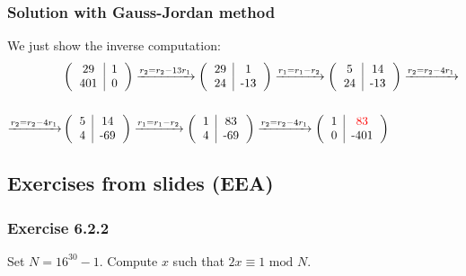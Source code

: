\documentclass[11pt, a4paper]{article}
\newcommand{\mymod}{
    \text{ mod }
}
\begin{document}
\subsubsection*{Solution with Gauss-Jordan method}
We just show the inverse computation:
\begin{align*}
    &\left(\begin{tabular}{c|c}
        29&1\\
        401&0
    \end{tabular}\right)\xrightarrow[]{r_2=r_2-13r_1}
    \left(\begin{tabular}{c|c}
        29&1\\
        24&-13
    \end{tabular}\right)\xrightarrow[]{r_1=r_1-r_2}
    \left(\begin{tabular}{c|c}
        5&14\\
        24&-13
    \end{tabular}\right)\xrightarrow[]{r_2=r_2-4r_1}\\\\\xrightarrow[]{r_2=r_2-4r_1}
    &\left(\begin{tabular}{c|c}
        5&14\\
        4&-69
    \end{tabular}\right)\xrightarrow[]{r_1=r_1-r_2}
    \left(\begin{tabular}{c|c}
        1&83\\
        4&-69
    \end{tabular}\right)\xrightarrow[]{r_2=r_2-4r_1}
    \left(\begin{tabular}{c|c}
        1&\textcolor{red}{83}\\
        0&-401
    \end{tabular}\right)
\end{align*}

\newpage
\subsection{Exercises from slides (EEA)}
\subsubsection{Exercise 6.2.2}
Set $N=16^{30}-1$. Compute $x$ such that $2x\equiv1\mymod N$.
\end{document}

